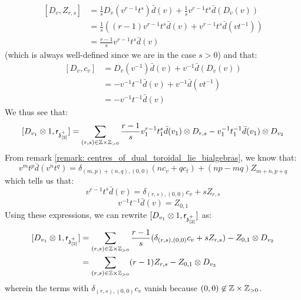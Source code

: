 \begin{remark}
\begin{enumerate}
\begin{enumerate}
\begin{enumerate}
$$\begin{aligned}
                                        [D_v, Z_{r, s}] & = \frac1s D_v( v^{r - 1} t^s ) \bar{d}(v) + \frac1s v^{r - 1} t^s \bar{d}(D_v(v))
                                        \\
                                        & = \frac1s \left( (r - 1) v^{r - 1} t^s \bar{d}(v) + v^{r - 1} t^s \bar{d}(v t^{-1}) \right)
                                        \\
                                        & = \frac{r - 1}{s} v^{r - 1} t^s \bar{d}(v) 
                                    \end{aligned}
                                $$
                            (which is always well-defined since we are in the case $s > 0$) and that:
                                $$
                                    \begin{aligned}
                                        [D_v, c_v] & = D_v(v^{-1}) \bar{d}(v) + v^{-1} \bar{d}(D_v(v))
                                        \\
                                        & = -v^{-1} t^{-1} \bar{d}(v) + v^{-1} \bar{d}(v t^{-1})
                                        \\
                                        & = -v^{-1} t^{-1} \bar{d}(v)
                                    \end{aligned}
                                $$
                            We thus see that:
                                $$[D_{v_1} \tensor 1, \sfr_{\z_{[2]}^+}] = \sum_{(r, s) \in \Z \x \Z_{> 0}} \frac{r - 1}{s} v_1^{r - 1} t_1^s \bar{d}(v_1)  \tensor D_{r, s} - v_1^{-1} t_1^{-1} \bar{d}(v_1) \tensor D_{v_2}$$
                            From remark \ref{remark: centres_of_dual_toroidal_lie_bialgebras}, we know that:
                                $$v^m t^p \bar{d}(v^n t^q) = \delta_{(m, p) + (n, q), (0, 0)} ( n c_v + q c_t ) + (np - mq) Z_{m + n, p + q}$$
                            which tells us that:
                                $$v^{r - 1} t^s \bar{d}(v) = \delta_{(r, s), (0, 0)} c_v + s Z_{r, s}$$
                                $$v^{-1} t^{-1} \bar{d}(v) = Z_{0, 1}$$
                            Using these expressions, we can rewrite $[D_{v_1} \tensor 1, \sfr_{\z_{[2]}^+}]$ as:
                                $$
                                    \begin{aligned}
                                        [D_{v_1} \tensor 1, \sfr_{\z_{[2]}^+}] & = \sum_{(r, s) \in \Z \x \Z_{> 0}} \frac{r - 1}{s} ( \delta_{(r, s), (0, 0)} c_v + s Z_{r, s} ) - Z_{0, 1} \tensor D_{v_2}
                                        \\
                                        & = \sum_{(r, s) \in \Z \x \Z_{> 0}} (r - 1) Z_{r, s} - Z_{0, 1} \tensor D_{v_2}
                                    \end{aligned}
                                $$
                            wherein the terms with $\delta_{(r, s), (0, 0)} c_v$ vanish because $(0, 0) \not \in \Z \x \Z_{> 0}$. 
 

\end{enumerate}
\end{enumerate}
\end{enumerate}
\end{remark}
